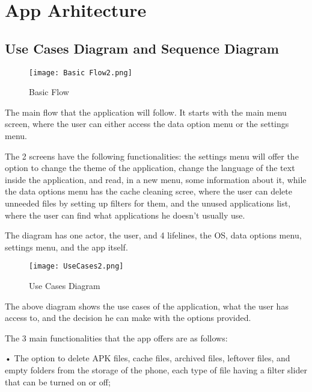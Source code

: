 
\chapter{App Arhitecture }\label{chapter:chap2}

\section{Use Cases Diagram and Sequence Diagram}\label{sect:initial use cases diagram}

\begin{figure}[htp]
    \centering
    \texttt{[image: Basic Flow2.png]}
    \caption{Basic Flow}
    \label{fig: Sequence Diagram}
\end{figure}

The main flow that the application will follow. It starts with the main menu screen, where the user can either access the data option menu or the settings menu. 

The 2 screens have the following functionalities: the settings menu will offer the option to change the theme of the application, change the language of the text inside the application, and read, in a new menu, some information about it, while the data options menu has the cache cleaning scree, where the user can delete unneeded files by setting up filters for them, and the unused applications list, where the user can find what applications he doesn't usually use.

The diagram has one actor, the user, and 4 lifelines, the \ac{OS}, data options menu, settings menu, and the app itself.

\begin{figure}[htp]
    \centering
    \texttt{[image: UseCases2.png]}
    \caption{Use Cases Diagram}
    \label{fig: Use Cases}
\end{figure}

The above diagram shows the use cases of the application, what the user has access to, and the decision he can make with the options provided.
    
    The 3 main functionalities that the app offers are as follows:

    • The option to delete \ac{APK} files, cache files, archived files, leftover files, and empty folders from the storage of the phone, each type of file having a filter slider that can be turned on or off;

